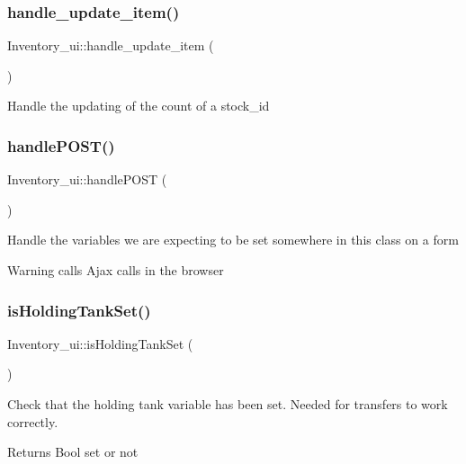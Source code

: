 \subsubsection{\texorpdfstring{handle\+\_\+update\+\_\+item()}{handle\_update\_item()}}
{\footnotesize\ttfamily Inventory\+\_\+ui\+::handle\+\_\+update\+\_\+item (\begin{DoxyParamCaption}{ }\end{DoxyParamCaption})}

Handle the updating of the count of a stock\+\_\+id \hypertarget{class_inventory__ui_a0bdd5eda22187fd5ed67fc9b03edbbba}{}\label{class_inventory__ui_a0bdd5eda22187fd5ed67fc9b03edbbba} 
\subsubsection{\texorpdfstring{handle\+P\+O\+S\+T()}{handlePOST()}}
{\footnotesize\ttfamily Inventory\+\_\+ui\+::handle\+P\+O\+ST (\begin{DoxyParamCaption}{ }\end{DoxyParamCaption})}

Handle the variables we are expecting to be set somewhere in this class on a form

\begin{DoxyWarning}{Warning}
calls Ajax calls in the browser 
\end{DoxyWarning}
\hypertarget{class_inventory__ui_aaa3f36bec8fb25199f697bf1983864aa}{}\label{class_inventory__ui_aaa3f36bec8fb25199f697bf1983864aa} 
\subsubsection{\texorpdfstring{is\+Holding\+Tank\+Set()}{isHoldingTankSet()}}
{\footnotesize\ttfamily Inventory\+\_\+ui\+::is\+Holding\+Tank\+Set (\begin{DoxyParamCaption}{ }\end{DoxyParamCaption})}

Check that the holding tank variable has been set. Needed for transfers to work correctly.

\begin{DoxyReturn}{Returns}
Bool set or not 
\end{DoxyReturn}
\hypertarget{class_inventory__ui_a5f2b542e69b9b6c8fe66d6ca513532f4}{}\label{class_inventory__ui_a5f2b542e69b9b6c8fe66d6ca513532f4} 
